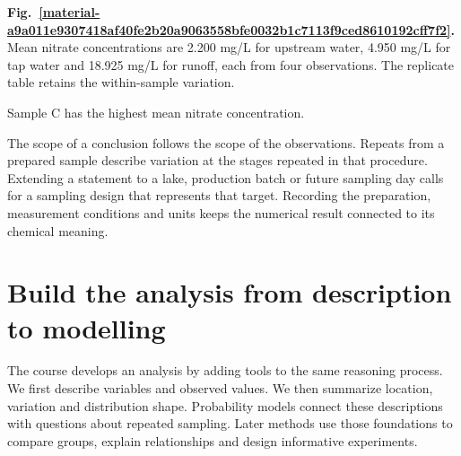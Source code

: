 \documentclass[11pt,a4paper]{article}
\begin{document}
\par\medskip
\Needspace{10cm}
\label{material-a9a011e9307418af40fe2b20a9063558bfe0032b1c7113f9ced8610192cff7f2}
\noindent\textbf{Fig.~\ref*{material-a9a011e9307418af40fe2b20a9063558bfe0032b1c7113f9ced8610192cff7f2}.} Mean nitrate concentrations are 2.200 mg/L for upstream water, 4.950 mg/L for tap water and 18.925 mg/L for runoff, each from four observations. The replicate table retains the within-sample variation.\par\nopagebreak
\begin{center}
\end{center}
\par Sample C has the highest mean nitrate concentration.
\medskip

The scope of a conclusion follows the scope of the observations. Repeats from a prepared sample describe variation at the stages repeated in that procedure. Extending a statement to a lake, production batch or future sampling day calls for a sampling design that represents that target. Recording the preparation, measurement conditions and units keeps the numerical result connected to its chemical meaning.


\clearpage
\section{Build the analysis from description to modelling}
The course develops an analysis by adding tools to the same reasoning process. We first describe variables and observed values. We then summarize location, variation and distribution shape. Probability models connect these descriptions with questions about repeated sampling. Later methods use those foundations to compare groups, explain relationships and design informative experiments.
\end{document}
